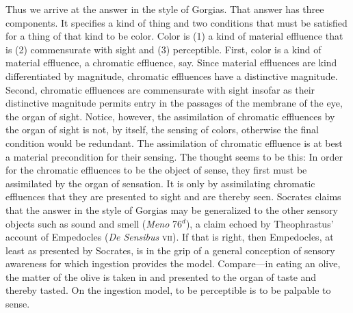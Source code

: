 Thus we arrive at the answer in the style of Gorgias. That answer has three components. It specifies a kind of thing and two conditions that must be satisfied for a thing of that kind to be color. Color is (1) a kind of material effluence that is (2) commensurate with sight and (3) perceptible. First, color is a kind of material effluence, a chromatic effluence, say. Since material effluences are kind differentiated by magnitude, chromatic effluences have a distinctive magnitude. Second, chromatic effluences are commensurate with sight insofar as their distinctive magnitude permits entry in the passages of the membrane of the eye, the organ of sight. Notice, however, the assimilation of chromatic effluences by the organ of sight is not, by itself, the sensing of colors, otherwise the final condition would be redundant. The assimilation of chromatic effluence is at best a material precondition for their sensing. The thought seems to be this: In order for the chromatic effluences to be the object of sense, they first must be assimilated by the organ of sensation. It is only by assimilating chromatic effluences that they are presented to sight and are thereby seen. Socrates claims that the answer in the style of Gorgias may be generalized to the other sensory objects such as sound and smell (\emph{Meno} 76\( ^{d} \)), a claim echoed by Theophrastus' account of Empedocles (\emph{De Sensibus} \textsc{vii}). If that is right, then Empedocles, at least as presented by Socrates, is in the grip of a general conception of sensory awareness for which ingestion provides the model. Compare---in eating an olive, the matter of the olive is taken in and presented to the organ of taste and thereby tasted. On the ingestion model, to be perceptible is to be palpable to sense. 

